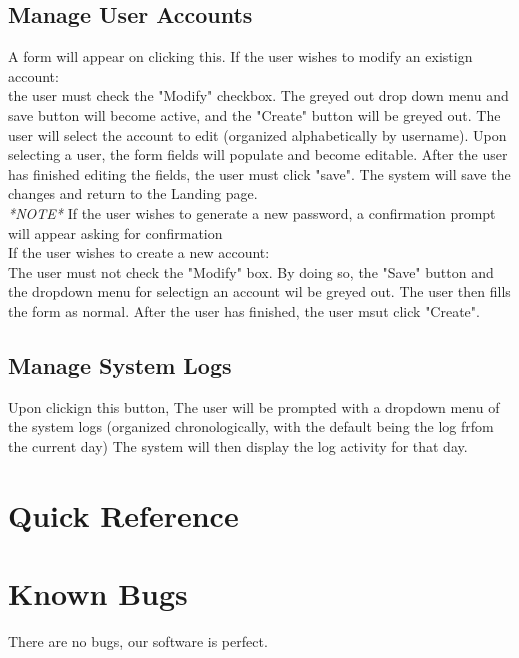 \documentclass{article}
\begin{document}
\subsection{Manage User Accounts}
A form will appear on clicking this. 
If the user wishes to modify an existign account: \\
the user must check the "Modify" checkbox. The greyed out drop down menu and save button will become active, and the "Create" button will be greyed out.  The user will select the account to edit (organized alphabetically by username). 
Upon selecting a user, the form fields will populate and become editable. After the user has finished editing the fields, the user must click "save". The system will save the changes and return to the Landing page. \\
\emph{*NOTE*} If the user wishes to generate a new password, a confirmation prompt will appear asking for confirmation \\
If the user wishes to create a new account: \\
The user must not check the "Modify" box. By doing so, the "Save" button and the dropdown menu for selectign an account wil be greyed out. The user then fills the form as normal. After the user has finished, 
the user msut click "Create". 
\subsection{Manage System Logs}
Upon clickign this button, The user will be prompted with a dropdown menu of the system logs (organized chronologically, with the default being the log frfom the current day)
The system will then display the log activity for that day.

\section{Quick Reference}  %

\section{Known Bugs}
There are no bugs, our software is perfect.
\end{document}
